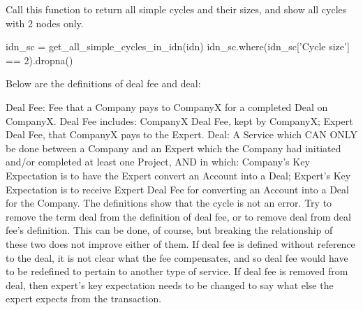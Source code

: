 Call this function to return all simple cycles and their sizes, and show all cycles with 2 nodes only.

\begin{pycode}
idn_sc = get_all_simple_cycles_in_idn(idn)
idn_sc.where(idn_sc['Cycle size'] == 2).dropna()
\end{pycode}

Below 
are the definitions of deal fee and deal:

Deal Fee: Fee that a Company pays to CompanyX for a completed Deal on CompanyX. Deal Fee includes:
CompanyX Deal Fee, kept by CompanyX;
Expert Deal Fee, that CompanyX pays to the Expert.
Deal: A Service which CAN ONLY be done between a Company and an Expert which the Company had initiated and/or completed at least one Project, AND in which:
Company’s Key Expectation is to have the Expert convert an Account into a Deal;
Expert’s Key Expectation is to receive Expert Deal Fee for converting an Account into a Deal for the Company.
The definitions show that the cycle is not an error. Try to remove the term deal from the definition of deal fee, or to remove deal from deal fee's definition. This can be done, of course, but breaking the relationship of these two does not improve either of them. If deal fee is defined without reference to the deal, it is not clear what the fee compensates, and so deal fee would have to be redefined to pertain to another type of service. If deal fee is removed from deal, then expert's key expectation needs to be changed to say what else the expert expects from the transaction.



\printbibliography